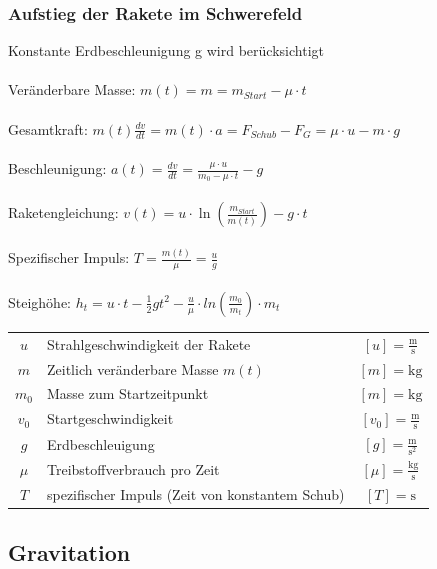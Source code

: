		\subsubsection{Aufstieg der Rakete im Schwerefeld}
			Konstante Erdbeschleunigung g wird berücksichtigt \\
			\\
			Veränderbare Masse: $m(t) = m = m_{Start} - \mu \cdot t$ \\
			\\
			Gesamtkraft: $m(t) \frac{dv}{dt} = m(t) \cdot a = F_{Schub} - F_G = \mu \cdot u - m \cdot g$ \\
			\\
			Beschleunigung: $a(t) = \frac{dv}{dt} = \frac{\mu \cdot u}{m_0 - \mu \cdot t} - g$ \\
			\\
			Raketengleichung: $v(t) = u \cdot \ln( \frac{m_{Start}}{m(t)} ) -  g \cdot t  $ \\
			\\
			Spezifischer Impuls: $T = \frac{m(t)}{\mu} = \frac{u}{g}$ \\
			\\
			Steighöhe: $h_t = u \cdot t - \frac{1}{2}gt^2 - \frac{u}{\mu} \cdot ln(\frac{m_0}{m_t}) \cdot m_t $
			\\
			\begin{tabular}{c l c}
				$u$ &  Strahlgeschwindigkeit der Rakete & $[u] =  \mathrm{\frac{m}{s}}$ \\	
				$m$ & Zeitlich veränderbare Masse $m(t)$ & $[m] = \mathrm{kg}$ \\
				$m_0$ & Masse zum Startzeitpunkt & $[m] = \mathrm{kg}$ \\
				$v_0$ & Startgeschwindigkeit & $[v_0] = \mathrm{\frac{m}{s}}$ \\
				$g$ & Erdbeschleuigung & $[g] = \mathrm{\frac{m}{s^2}}$ \\
				$\mu$ & Treibstoffverbrauch pro Zeit & $[\mu] = \mathrm{\frac{kg}{s}}$ \\
				$T$ & spezifischer Impuls (Zeit von konstantem Schub) & $[T] = \mathrm{s}$  \\
			\end{tabular}

	\subsection{Gravitation}
